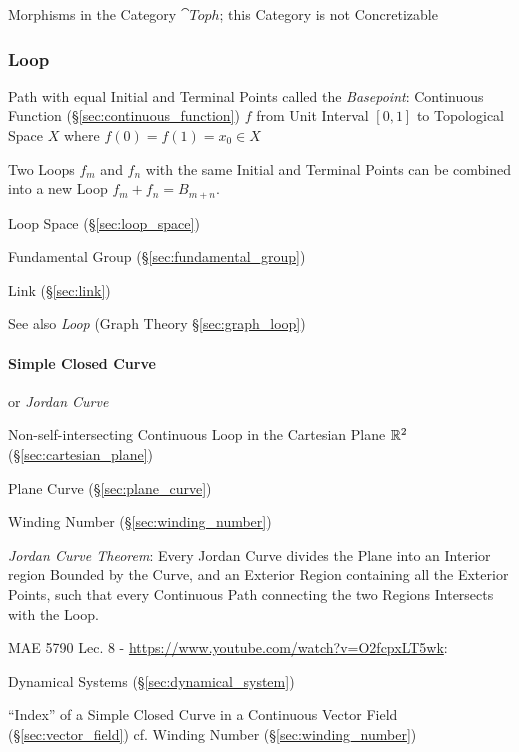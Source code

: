 Morphisms in the Category $\cat{Toph}$; this Category is not
Concretizable



\subsubsection{Loop}\label{sec:loop}

Path with equal Initial and Terminal Points called the
\emph{Basepoint}: Continuous Function
(\S\ref{sec:continuous_function}) $f$ from Unit Interval $[0,1]$ to
Topological Space $X$ where $f(0) = f(1) = x_0 \in X$

Two Loops $f_m$ and $f_n$ with the same Initial and Terminal Points
can be combined into a new Loop $f_m + f_n = B_{m+n}$.
\cite{hatcher02}

Loop Space (\S\ref{sec:loop_space})

Fundamental Group (\S\ref{sec:fundamental_group})

Link (\S\ref{sec:link})

\fist See also \emph{Loop} (Graph Theory \S\ref{sec:graph_loop})



\paragraph{Simple Closed Curve}\label{sec:simple_closed_curve}\hfill

or \emph{Jordan Curve}

Non-self-intersecting Continuous Loop in the Cartesian Plane $\mathbb{R}^2$
(\S\ref{sec:cartesian_plane})

\fist Plane Curve (\S\ref{sec:plane_curve})

Winding Number (\S\ref{sec:winding_number})

\emph{Jordan Curve Theorem}: Every Jordan Curve divides the Plane into an
Interior region Bounded by the Curve, and an Exterior Region containing all the
Exterior Points, such that every Continuous Path connecting the two Regions
Intersects with the Loop.


MAE 5790 Lec. 8 - \url{https://www.youtube.com/watch?v=O2fcpxLT5wk}:

\fist Dynamical Systems (\S\ref{sec:dynamical_system})

``Index'' of a Simple Closed Curve in a Continuous Vector Field
(\S\ref{sec:vector_field}) \fist cf. Winding Number
(\S\ref{sec:winding_number})



